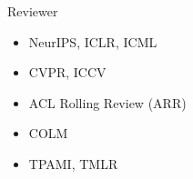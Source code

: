 
Reviewer

\begin{itemize}
 \item NeurIPS, ICLR, ICML \\
 \item CVPR, ICCV \\
 \item ACL Rolling Review (ARR) \\
 \item COLM \\
 \item TPAMI, TMLR \\
\end{itemize}
